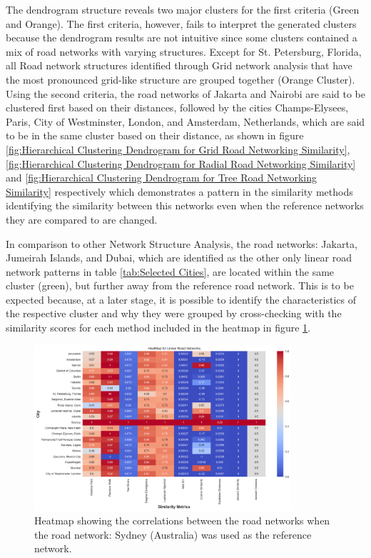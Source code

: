 The dendrogram structure reveals two major clusters for the first criteria (Green and Orange). The first criteria, however, fails to interpret the generated clusters because the dendrogram results are not intuitive since some clusters contained a mix of road networks with varying structures. Except for St. Petersburg, Florida, all Road network structures identified through Grid network analysis that have the most pronounced grid-like structure are grouped together (Orange Cluster). Using the second criteria, the road networks of Jakarta and Nairobi are said to be clustered first based on their distances, followed by the cities Champs-Elysees, Paris, City of Westminster, London, and Amsterdam, Netherlands, which are said to be in the same cluster based on their distance, as shown in figure \ref{fig:Hierarchical Clustering Dendrogram for Grid Road Networking Similarity}, \ref{fig:Hierarchical Clustering Dendrogram for Radial Road Networking Similarity} and \ref{fig:Hierarchical Clustering Dendrogram for Tree Road Networking Similarity} respectively which demonstrates a pattern in the similarity methods identifying the similarity between this networks even when the reference networks they are compared to are changed.

In comparison to other Network Structure Analysis, the road networks: Jakarta, Jumeirah Islands, and Dubai, which are identified as the other only linear road network patterns in table \ref{tab:Selected Cities}, are located within the same cluster (green), but further away from the reference road network. This is to be expected because, at a later stage, it is possible to identify the characteristics of the respective cluster and why they were grouped by cross-checking with the similarity scores for each method included in the heatmap in figure \ref{fig:Heatmap showing the correlations for Linear Road Networks}.

\begin{figure}[!ht]
\centering
\includegraphics[width=0.85\textwidth,center]{picture/Linear/linearheatmap.png}
\caption[Heatmap showing the correlations for Linear Road Networks]{Heatmap showing the correlations between the road networks when the road network: Sydney (Australia) was used as the reference network.}
\label{fig:Heatmap showing the correlations for Linear Road Networks}
\end{figure}

